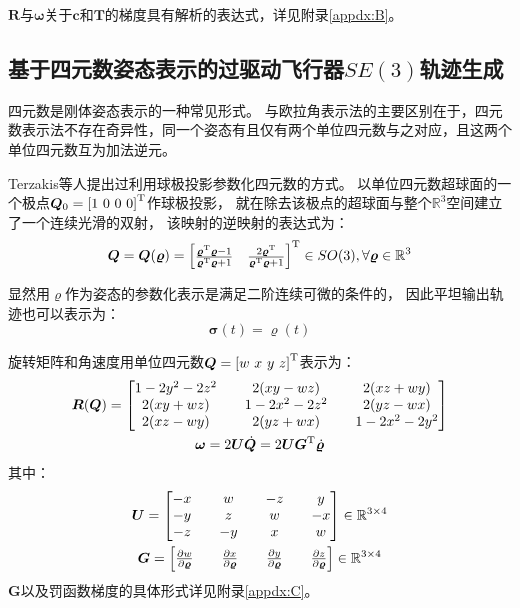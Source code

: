 $\bm{R}$与$\bm{\omega}$关于$\bm{c}$和$\bm{T}$的梯度具有解析的表达式，详见附录\ref{appdx:B}。

\subsection{基于四元数姿态表示的过驱动飞行器$SE(3)$轨迹生成}\label{subsec:planning_based_on_quaternion}
四元数是刚体姿态表示的一种常见形式。
与欧拉角表示法的主要区别在于，四元数表示法不存在奇异性，同一个姿态有且仅有两个单位四元数与之对应，且这两个单位四元数互为加法逆元。

Terzakis等人提出过利用球极投影参数化四元数的方式。
以单位四元数超球面的一个极点$\bm{Q}_0=\trans{[1\  0 \ 0 \ 0]}$作球极投影，
就在除去该极点的超球面与整个$\mathbb{R}^3$空间建立了一个连续光滑的双射，
该映射的逆映射的表达式为： 
\begin{equation}
  \bm{Q} = \bm{Q}(\bm{\varrho}) = {
    \begin{bmatrix}
      \frac{{\bm{\varrho}}^{\text{T}}\bm{\varrho}-1}{{\bm{\varrho}}^{\text{T}}\bm{\varrho}+1} & 
      \frac{2{\bm{\varrho}}^{\text{T}}}{{\bm{\varrho}}^{\text{T}}\bm{\varrho}+1}
    \end{bmatrix}
  }^{\text{T}} \in SO(3), \forall \bm{\varrho} \in \mathbb{R}^3
  \label{equ:R3_to_quaternion}
\end{equation}

显然用$\bm{\varrho}$作为姿态的参数化表示是满足二阶连续可微的条件的，
因此平坦输出轨迹也可以表示为：
\begin{equation}
  \bm{\sigma}(t) = \bm{\varrho}(t)
\end{equation}

旋转矩阵和角速度用单位四元数$\bm{Q} = {[w\  x \ y \ z]}^{\text{T}}$表示为：
\begin{gather}
  \bm{R}(\bm{Q}) = 
  \begin{bmatrix}
    1 - 2y^2 -2z^2 & & 2(xy - wz) & & 2(xz + wy) \\ 
    2(xy + wz) & & 1 - 2x^2 - 2z^2 & & 2(yz - wx) \\ 
    2(xz - wy) & & 2(yz + wx) & & 1 - 2x^2 - 2y^2
  \end{bmatrix} \label{equ:quaternion_to_R} \\ 
  \bm{\omega} = 2\bm{U}\dot{\bm{Q}} = 2\bm{U}{\bm{G}}^{\text{T}}\dot{\bm{\varrho}} \label{equ:dquat_to_omega}
\end{gather}
其中： 
\begin{gather}
  \bm{U} = 
  \begin{bmatrix}
    -x & & w & & -z & & y \\
    -y & & z & & w & & -x \\
    -z & & -y & & x & & w
  \end{bmatrix} \in \mathbb{R}^{3\times 4} \label{equ:matrix_U}\\
  \bm{G} = 
  \begin{bmatrix}
    \frac{\partial{w}}{\partial{\bm{\varrho}}} & & \frac{\partial{x}}{\partial{\bm{\varrho}}} & & \frac{\partial{y}}{\partial{\bm{\varrho}}} & & \frac{\partial{z}}{\partial{\bm{\varrho}}}
  \end{bmatrix} \in \mathbb{R}^{3 \times 4} \label{equ:matrix_G}
\end{gather}
$\bm{G}$以及罚函数梯度的具体形式详见附录\ref{appdx:C}。

